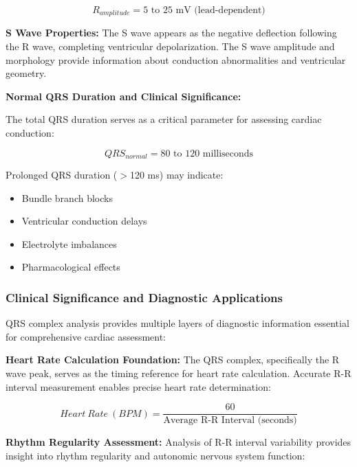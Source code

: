 \documentclass[12pt,a4paper]{article}
\begin{document}
\begin{equation*}
R_{amplitude} = 5 \text{ to } 25 \text{ mV (lead-dependent)}
\end{equation*}

\textbf{S Wave Properties:} The S wave appears as the negative deflection following the R wave, completing ventricular depolarization. The S wave amplitude and morphology provide information about conduction abnormalities and ventricular geometry.

\vspace{0.5cm}

\textbf{Normal QRS Duration and Clinical Significance:}

The total QRS duration serves as a critical parameter for assessing cardiac conduction:

\begin{equation*}
QRS_{normal} = 80 \text{ to } 120 \text{ milliseconds}
\end{equation*}

Prolonged QRS duration ($>$120 ms) may indicate:
\begin{itemize}
\item Bundle branch blocks
\item Ventricular conduction delays
\item Electrolyte imbalances
\item Pharmacological effects
\end{itemize}

\subsubsection{Clinical Significance and Diagnostic Applications}

QRS complex analysis provides multiple layers of diagnostic information essential for comprehensive cardiac assessment:

\vspace{0.3cm}

\textbf{Heart Rate Calculation Foundation:} The QRS complex, specifically the R wave peak, serves as the timing reference for heart rate calculation. Accurate R-R interval measurement enables precise heart rate determination:

\begin{equation*}
Heart\ Rate\ (BPM) = \frac{60}{\text{Average R-R Interval (seconds)}}
\end{equation*}

\textbf{Rhythm Regularity Assessment:} Analysis of R-R interval variability provides insight into rhythm regularity and autonomic nervous system function:
\end{document}
